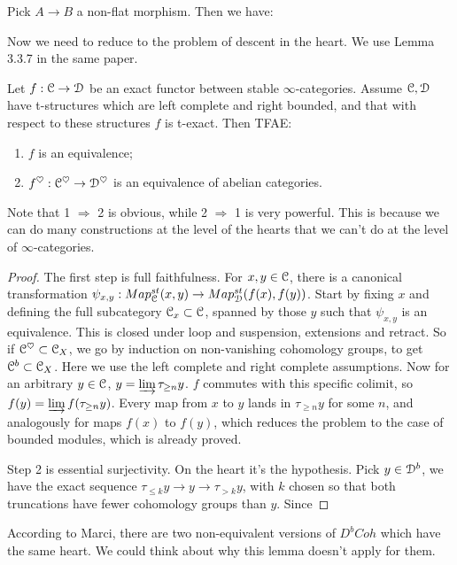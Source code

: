 \begin{eg}
Pick $A \to B$ a non-flat morphism. Then we have: 
\end{eg}

Now we need to reduce to the problem of descent in the heart. We use Lemma 3.3.7 in the same paper.
\begin{lem}
\label{lem:equiv_heart}
Let $f : \mathcal C \to \mathcal D$ be an exact functor between stable $\infty$-categories. Assume $\mathcal C, \mathcal D$ have t-structures which
are left complete and right bounded, and that with respect to these structures $f$ is t-exact. Then TFAE:
\begin{enumerate}
\item $f$ is an equivalence;
\item $f^{\heartsuit} : \mathcal C^{\heartsuit} \to \mathcal D^{\heartsuit}$ is an equivalence of abelian categories.
\end{enumerate}
\end{lem}
Note that 1 $\Rightarrow$ 2 is obvious, while 2 $\Rightarrow$ 1 is very powerful. This is because we can do many constructions
at the level of the hearts that we can't do at the level of $\infty$-categories.

\begin{proof}
The first step is full faithfulness. For $x,y \in \mathcal C$, there is a canonical transformation $\psi_{x,y} :
Map_{\mathcal C}^{st}(x,y) \to Map_{\mathcal D}^{st}(f(x), f(y))$. Start by fixing $x$ and defining the full subcategory $\mathcal C_x \subset \mathcal C$,
spanned by those $y$ such that $\psi_{x,y}$ is an equivalence. This is closed under loop and suspension, extensions
and retract. So if $\mathcal C^{\heartsuit} \subset \mathcal C_X$, we go by induction on non-vanishing cohomology groups,
to get $\mathcal C^b \subset \mathcal C_X$. Here we use the left complete and right complete assumptions. Now for an arbitrary $y\in \mathcal C$,
$y = \varinjlim \tau_{\geq n} y$. $f$ commutes with this specific colimit, so $f(y) = \varinjlim f(\tau_{\geq n} y)$.
Every map from $x$ to $y$ lands in $\tau_{\geq n} y$ for some $n$, and analogously for maps $f(x)$ to $f(y)$, which reduces
the problem to the case of bounded modules, which is already proved.

Step 2 is essential surjectivity. On the heart it's the hypothesis. Pick $y\in \mathcal D^b$, we have the exact sequence
$\tau_{\leq k} y \to y \to \tau_{>k} y$, with $k$ chosen so that both truncations have fewer cohomology groups than $y$.
Since 
\end{proof}

\begin{rem}
According to Marci, there are two non-equivalent versions of $D^bCoh$ which have the same heart. We could think about why
this lemma doesn't apply for them.
\end{rem}

